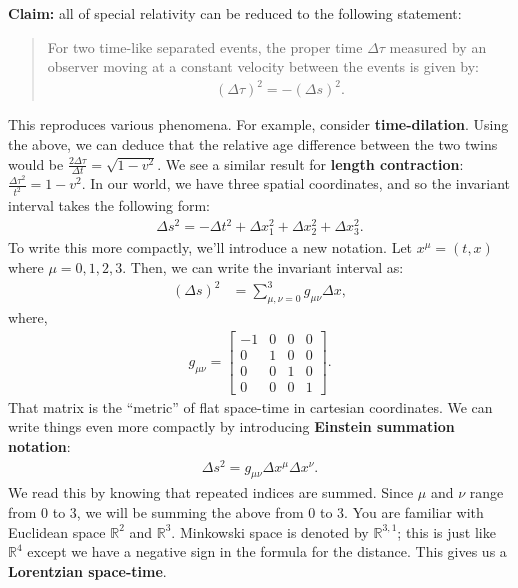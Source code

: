 \documentclass[11pt]{article}
\newcommand{\R}[0]{\mathbb{R}}
\theoremstyle{definition}
\begin{document}
\textbf{Claim:} all of special relativity can be reduced to the following statement: 
\begin{quote}
	For two time-like separated events, the proper time \( \Delta \tau \) measured by an observer moving at a constant velocity between the events is given by:
	\begin{align*}
		( \Delta \tau ) ^2 = - ( \Delta s)^2.
	\end{align*}
\end{quote}
This reproduces various phenomena. For example, consider \textbf{time-dilation}. Using the above, we can deduce that the relative age difference between the two twins would be \( \frac{2 \Delta \tau}{\Delta t} =\sqrt{1-v^2} \). We see a similar result for \textbf{length contraction}: \( \frac{\Delta \tau^2}{t^2} = 1 - v^2 \). In our world, we have three spatial coordinates, and so the invariant interval takes the following form:
\begin{align*}
	\Delta s^2 = - \Delta t^2 + \Delta x_1^2 + \Delta x_2^2 + \Delta x_3^2. 
\end{align*}
To write this more compactly, we'll introduce a new notation. Let \( x^\mu = (t, x) \) where \( \mu = 0, 1, 2, 3 \). Then, we can write the invariant interval as: 
\begin{align}
	(\Delta s)^2 & = \sum_{\mu, \nu = 0}^3 g_{\mu \nu} \Delta x, 
\end{align}
where, 
\begin{align*}
	g_{\mu \nu} = \begin{bmatrix}
		-1 & 0 & 0 & 0 \\
		0 & 1 & 0 & 0 \\
		0 & 0 & 1 & 0 \\
		0 & 0 & 0 & 1
	\end{bmatrix}. 
\end{align*}
That matrix is the ``metric'' of flat space-time in cartesian coordinates. We can write things even more compactly by introducing \textbf{Einstein summation notation}:
\begin{align*}
	\Delta s^2 = g_{\mu \nu} \Delta x^\mu \Delta x^\nu. 
\end{align*}
We read this by knowing that repeated indices are summed. Since \( \mu \) and \( \nu \) range from 0 to 3, we will be summing the above from 0 to 3. 
\newline
\newline
You are familiar with Euclidean space \( \R^2 \) and \( \R^3 \). Minkowski space is denoted by \( \R^{3,1} \); this is just like \( \R^4 \) except we have a negative sign in the formula for the distance. This gives us a \textbf{Lorentzian space-time}. 
\end{document}
